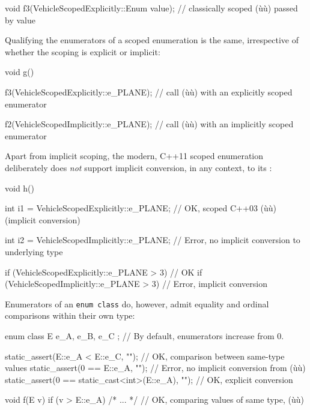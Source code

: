 \begin{emcppslisting}[emcppsbatch=e3,]
void f3(VehicleScopedExplicitly::Enum value);
    // classically scoped (ù{}ù) passed by value
\end{emcppslisting}

\noindent Qualifying the enumerators of a scoped enumeration is the same,
irrespective of whether the scoping is explicit or implicit:

\begin{emcppslisting}[emcppsbatch=e3]
void g()
{
    f3(VehicleScopedExplicitly::e_PLANE);
        // call (ù{}ù) with an explicitly scoped enumerator

    f2(VehicleScopedImplicitly::e_PLANE);
        // call (ù{}ù) with an implicitly scoped enumerator
}
\end{emcppslisting}

\noindent Apart from implicit scoping, the modern, C++11
scoped enumeration deliberately does \emph{not} support
implicit conversion, in any context, to its :

\begin{emcppslisting}[emcppsbatch=e3]
void h()
{
    int i1 = VehicleScopedExplicitly::e_PLANE;
       // OK, scoped C++03 (ù{}ù) (implicit conversion)

    int i2 = VehicleScopedImplicitly::e_PLANE;
        // Error, no implicit conversion to underlying type

    if (VehicleScopedExplicitly::e_PLANE > 3) {} // OK
    if (VehicleScopedImplicitly::e_PLANE > 3) {} // Error, implicit conversion
}
\end{emcppslisting}

\noindent Enumerators of an \lstinline!enum!~\lstinline!class! do, however, admit
equality and ordinal comparisons within their own type:

\begin{emcppslisting}[emcppsbatch=e4]
enum class E { e_A, e_B, e_C };  // By default, enumerators increase from 0.

static_assert(E::e_A < E::e_C, "");  // OK, comparison between same-type values
static_assert(0 == E::e_A, "");      // Error, no implicit conversion from (ù{}ù)
static_assert(0 == static_cast<int>(E::e_A), "");  // OK, explicit conversion

void f(E v)
{
    if (v > E::e_A) { /* ... */ }  // OK, comparing values of same type, (ù{}ù)
}
\end{emcppslisting}

